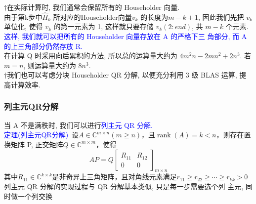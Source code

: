 \documentclass[12pt,a4paper]{article}
\begin{document}
$\dagger$在实际计算时, 我们通常会保留所有的 Householder 向量.\\

由于第k步中$\hat{H}_{k}$ 所对应的Householder向量$v_{k}$ 的长度为$m−k+1$, 因此我们先把 $v_{k}$ 单位化, 使得 $v_{k}$ 的第一元素为 1, 这样就只要存储 $v_{k}(2:end)$, 共 $m - k$ 个元素.\\

\textcolor{blue}{这样, 我们就可以把所有的 Householder 向量存放在 A 的严格下三 角部分, 而 A 的上三角部分仍然存放 R.}\\

在计算 Q 时采用向后累积的方法, 所以总的运算量大约为 $4m^{2}n - 2mn^{2} + 2n^{3}$. 若 $m = n$, 则运算量大约为 $8n^{3}$.\\

$\dagger$我们也可以考虑分块 Householder QR 分解, 以便充分利用 3 级 BLAS 运算, 提高计算效率.\\
\subsubsection{列主元QR分解}
\noindent 当 A 不是满秩时, 我们可以进行\textcolor{blue}{列主元 QR 分解.}\\
\textcolor{blue}{定理(列主元QR分解)}~设$A \in \mathbb{C}^{m \times n}(m \geq n)$，且$\operatorname{rank}(A)=k<n$，则存在置换矩阵 P, 正交矩阵$Q \in \mathbb{C}^{m \times m}$，使得
$$
A P=Q\left[\begin{array}{cc}{R_{11}} & {R_{12}} \\ {0} & {0}\end{array}\right]_{m \times n}
$$
其中$R_{11} \in \mathbb{C}^{k \times k}$是非奇异上三角矩阵，且对角线元素满足$r_{11} \geq r_{22} \geq \cdots \geq r_{k k}>0$\\

列主元 QR 分解的实现过程与 QR 分解基本类似, 只是每一步需要选个列 主元, 同时做一个列交换\\
\end{document}
